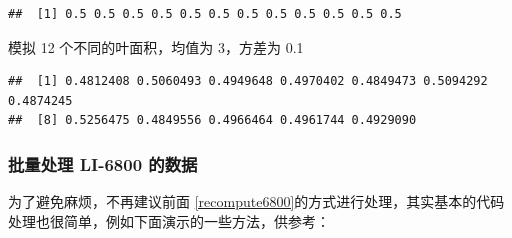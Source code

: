 \documentclass[
]{krantz}
\makeatletter
\newenvironment{Shaded}{\begin{snugshade}}{\end{snugshade}}
\newcommand{\AttributeTok}[1]{\textcolor[rgb]{0.77,0.63,0.00}{#1}}
\newcommand{\DecValTok}[1]{\textcolor[rgb]{0.00,0.00,0.81}{#1}}
\newcommand{\FloatTok}[1]{\textcolor[rgb]{0.00,0.00,0.81}{#1}}
\newcommand{\FunctionTok}[1]{\textcolor[rgb]{0.00,0.00,0.00}{#1}}
\newcommand{\NormalTok}[1]{#1}
\newcommand{\OtherTok}[1]{\textcolor[rgb]{0.56,0.35,0.01}{#1}}
\newcommand{\SpecialCharTok}[1]{\textcolor[rgb]{0.00,0.00,0.00}{#1}}
\newcommand{\StringTok}[1]{\textcolor[rgb]{0.31,0.60,0.02}{#1}}
\newenvironment{kframe}{%
\medskip{}
\setlength{\fboxsep}{.8em}
 \def\at@end@of@kframe{}%
 \ifinner\ifhmode%
  \def\at@end@of@kframe{\end{minipage}}%
  \begin{minipage}{\columnwidth}%
 \fi\fi%
 \def\FrameCommand##1{\hskip\@totalleftmargin \hskip-\fboxsep
 \colorbox{shadecolor}{##1}\hskip-\fboxsep
     \hskip-\linewidth \hskip-\@totalleftmargin \hskip\columnwidth}%
 \MakeFramed {\advance\hsize-\width
   \@totalleftmargin\z@ \linewidth\hsize
   \@setminipage}}%
 {\par\unskip\endMakeFramed%
 \at@end@of@kframe}
\renewenvironment{Shaded}{\begin{kframe}}{\end{kframe}}
\makeatother
\begin{document}
\begin{verbatim}
##  [1] 0.5 0.5 0.5 0.5 0.5 0.5 0.5 0.5 0.5 0.5 0.5 0.5
\end{verbatim}

模拟 12 个不同的叶面积，均值为 3，方差为 0.1

\begin{Shaded}
\end{Shaded}

\begin{verbatim}
##  [1] 0.4812408 0.5060493 0.4949648 0.4970402 0.4849473 0.5094292 0.4874245
##  [8] 0.5256475 0.4849556 0.4966464 0.4961744 0.4929090
\end{verbatim}

\hypertarget{batch-6800-xlsx}{%
\subsubsection{批量处理 LI-6800 的数据}\label{batch-6800-xlsx}}

为了避免麻烦，不再建议前面 \ref{recompute6800}的方式进行处理，其实基本的代码处理也很简单，例如下面演示的一些方法，供参考：
\end{document}
